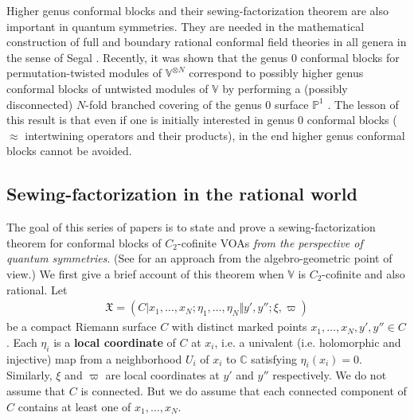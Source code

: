 \documentclass[11pt,b5paper,notitlepage]{article}
\theoremstyle{definition}
\theoremstyle{plain}
\newcommand{\Vbb}{\mathbb V}
\newcommand{\Cbb}{\mathbb C}
\newcommand{\Pbb}{\mathbb P}
\newcommand{\<}{\left\langle}
\renewcommand{\>}{\right\rangle}
\newcommand{\fx}{\mathfrak{X}}
\numberwithin{equation}{section}
\begin{document}
Higher genus conformal blocks and their sewing-factorization theorem are also important in quantum symmetries. They are needed in the mathematical construction of full and boundary rational conformal field theories in all genera in the sense of Segal \cite{Segal-CFT1,Segal-CFT2}. Recently, it was shown that the genus $0$ conformal blocks for permutation-twisted modules of $\Vbb^{\otimes N}$ correspond to possibly higher genus conformal blocks of untwisted modules of $\Vbb$ by performing a (possibly disconnected) $N$-fold branched covering of the genus $0$ surface $\Pbb^1$ \cite{Gui-permutation}. The lesson of this result is that even if one is initially interested in genus $0$ conformal blocks ($\approx$ intertwining operators and their products), in the end higher genus conformal blocks cannot be avoided.

\subsection{Sewing-factorization in the rational world}\label{lb84}


The goal of this series of papers is to state and prove a sewing-factorization theorem for conformal blocks of $C_2$-cofinite VOAs \emph{from the perspective of quantum symmetries}. (See \cite{DGK-presentations} for an approach from the algebro-geometric point of view.) We first give a brief account of this theorem when $\Vbb$ is $C_2$-cofinite and also rational. Let
\begin{align}
\fx=(C|x_1,\dots,x_N;\eta_1,\dots,\eta_N\Vert y',y'';\xi,\varpi)
\end{align}
be a compact Riemann surface $C$ with distinct marked points $x_1,\dots,x_N,y',y''\in C$. Each $\eta_i$ is a \textbf{local coordinate} of $C$ at $x_i$, i.e. a univalent (i.e. holomorphic and injective) map from a neighborhood $U_i$ of $x_i$ to $\Cbb$ satisfying $\eta_i(x_i)=0$. Similarly, $\xi$ and $\varpi$ are local coordinates at $y'$ and $y''$ respectively. We do not assume that $C$ is connected. But we do assume that each connected component of $C$ contains at least one of $x_1,\dots,x_N$. 
\end{document}
